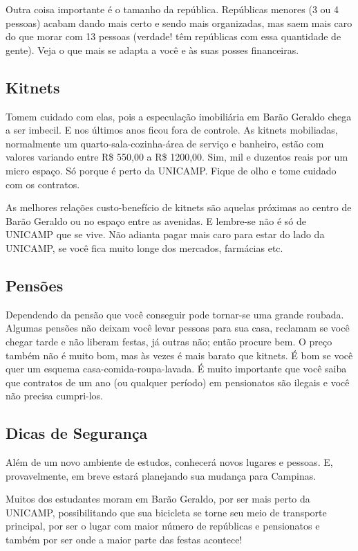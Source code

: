 \documentclass[a4paper,10pt]{article}
\begin{document}
Outra coisa importante é o tamanho da república. Repúblicas menores (3 ou
4 pessoas) acabam dando mais certo e sendo mais organizadas, mas saem mais caro
do que morar com 13 pessoas (verdade! têm repúblicas com essa quantidade de
gente). Veja o que mais se adapta a você e às suas posses financeiras.

\subsection{Kitnets}
Tomem cuidado com elas, pois a especulação imobiliária em Barão Geraldo chega
a ser imbecil. E nos últimos anos ficou fora de controle. As kitnets mobiliadas,
normalmente um quarto-sala-cozinha-área de serviço e banheiro, estão com valores
variando entre R\$ 550,00 a R\$ 1200,00. Sim, mil e duzentos reais por um micro
espaço. Só porque é perto da UNICAMP. Fique de olho e tome cuidado com os
contratos.

As melhores relações custo-benefício de kitnets são aquelas próximas ao centro
de Barão Geraldo ou no espaço entre as avenidas. E lembre-se não é só de UNICAMP
que se vive. Não adianta pagar mais caro para estar do lado da UNICAMP, se você
fica muito longe dos mercados, farmácias etc.

\subsection{Pensões}
Dependendo da pensão que você conseguir pode tornar-se uma grande roubada.
Algumas pensões não deixam você levar pessoas para sua casa, reclamam se você
chegar tarde e não liberam festas, já outras não; então procure bem. O preço
também não é muito bom, mas às vezes é mais barato que kitnets. É bom se você
quer um esquema casa-comida-roupa-lavada. É muito importante que você saiba que
contratos de um ano (ou qualquer período) em pensionatos são ilegais e você não
precisa cumpri-los.

\subsection{Dicas de Segurança}
Além de um novo ambiente de estudos, conhecerá novos lugares e pessoas. E,
provavelmente, em breve estará planejando sua mudança para Campinas.

Muitos dos estudantes moram em Barão Geraldo, por ser mais perto da UNICAMP,
possibilitando que sua bicicleta se torne seu meio de transporte principal, por
ser o lugar com maior número de repúblicas e pensionatos e também por ser onde
a maior parte das festas acontece!
\end{document}
